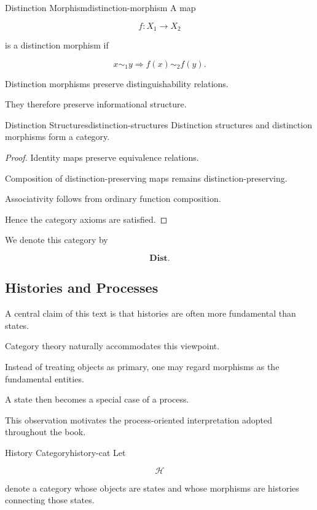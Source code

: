 \documentclass[12pt,twoside,openright]{book}
\begin{document}
\begin{definition}{Distinction Morphism}{distinction-morphism}
A map

\[
f:X_1\rightarrow X_2
\]

is a distinction morphism if

\[
x\sim_1 y
\Longrightarrow
f(x)\sim_2 f(y).
\]
\end{definition}

Distinction morphisms preserve distinguishability
relations.

They therefore preserve informational structure.

\begin{proposition}{Distinction Structures}{distinction-structures}
Distinction structures and distinction morphisms form a
category.
\end{proposition}

\begin{proof}
Identity maps preserve equivalence relations.

Composition of distinction-preserving maps remains
distinction-preserving.

Associativity follows from ordinary function composition.

Hence the category axioms are satisfied.
\end{proof}

We denote this category by

\[
\mathbf{Dist}.
\]

\subsection{Histories and Processes}

A central claim of this text is that histories are often
more fundamental than states.

Category theory naturally accommodates this viewpoint.

Instead of treating objects as primary, one may regard
morphisms as the fundamental entities.

A state then becomes a special case of a process.

This observation motivates the process-oriented
interpretation adopted throughout the book.

\begin{definition}{History Category}{history-cat}
Let

\[
\mathcal H
\]

denote a category whose objects are states and whose
morphisms are histories connecting those states.
\end{definition}
\end{document}
